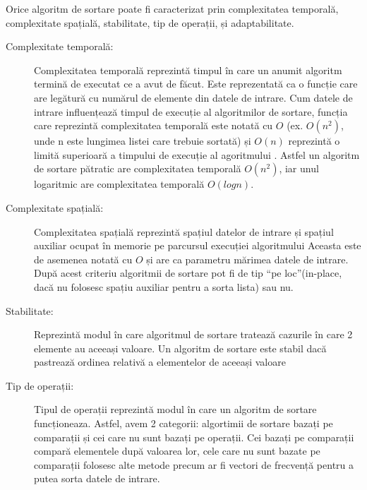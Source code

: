 \documentclass[12pt]{article}
\begin{document}
Orice algoritm de sortare poate fi caracterizat prin complexitatea temporală, complexitate spațială, stabilitate, tip de operații,
și adaptabilitate.

\begin{description}
\item[Complexitate temporală: ]
Complexitatea temporală reprezintă timpul în care un anumit algoritm termină de executat ce a avut de făcut. Este reprezentată ca o funcție
care are legătură cu numărul de elemente din datele de intrare. Cum datele de intrare influențează timpul de execuție al algoritmilor
de sortare, funcția care reprezintă complexitatea temporală este notată cu $O$ (ex. $O(n^2)$, unde n este lungimea listei care trebuie sortată) și
$O(n)$ reprezintă o limită superioară a timpului de execuție al agoritmului \cite{cormenIntroduction}.
Astfel un algoritm de sortare pătratic are complexitatea temporală $O(n^2)$, iar unul logaritmic are complexitatea temporală $O(log n)$.
\end{description}

\begin{description}
\item[Complexitate spațială: ]
Complexitatea spațială reprezintă spațiul datelor de intrare și spațiul auxiliar ocupat în memorie pe parcursul execuției
algoritmului Aceasta este de asemenea notată cu $O$ și are ca parametru mărimea datele de intrare. După acest criteriu algoritmii de sortare
pot fi de tip ``pe loc''(in-place, dacă nu folosesc spațiu auxiliar pentru a sorta lista) sau nu.
\end{description}

\begin{description}
\item[Stabilitate: ]
Reprezintă modul în care algoritmul de sortare tratează cazurile în care 2 elemente au aceeași valoare. Un algoritm de sortare este
stabil dacă pastrează ordinea relativă a elementelor de aceeași valoare
\end{description}

\begin{description}
\item[Tip de operații: ]
Tipul de operații reprezintă modul în care un algoritm de sortare funcționeaza. Astfel, avem 2 categorii: algortimii de sortare bazați
pe comparații și cei care nu sunt bazați pe operații. Cei bazați pe comparații compară elementele după valoarea lor, cele care nu sunt
bazate pe comparații folosesc alte metode precum ar fi vectori de frecvență pentru a putea sorta datele de intrare.
\end{description}
\end{document}
